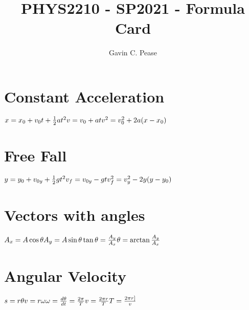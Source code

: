 \documentclass[14pt]{article}
\title{PHYS2210 - SP2021 - Formula Card}
\author{Gavin C. Pease}
\begin{document}
    \maketitle
    \begin{paracol}{2}
        \section*{Constant Acceleration}
        \begin{fleqn}
            $
            x=x_0+v_0t + \frac{1}{2}at^2 \newline
            v=v_0+at \newline
            v^2 = v_0^2 +2a(x-x_0) \newline
            $
        \end{fleqn}
        \section*{Free Fall}
        \begin{fleqn}
            $
            y=y_0 +v_{0y} + \frac{1}{2}gt^2 \newline
            v_f=v_{0y}-gt \newline
            v_f^2 = v_y^2 -2y(y-y_0) \newline
            $
        \end{fleqn}
        \section*{Vectors with angles}
        \begin{fleqn}
            $
            A_x=A\cos\theta \newline
            A_y=A\sin\theta \newline
            \tan\theta = \frac{A_y}{A_x} \newline
            \theta = \arctan\frac{A_y}{A_x} \newline
            $
        \end{fleqn}

        \section*{Angular Velocity}
        \begin{fleqn}
            $
            s=r\theta \newline
            v=r\omega \newline
            \omega = \frac{d\theta}{dt} = \frac{2\pi}{T} \newline
            v = \frac{2\pi r}{T} \newline
            T = \frac{2\pi r]}{v} \newline
            $
        \end{fleqn}

\end{paracol}
\end{document}
